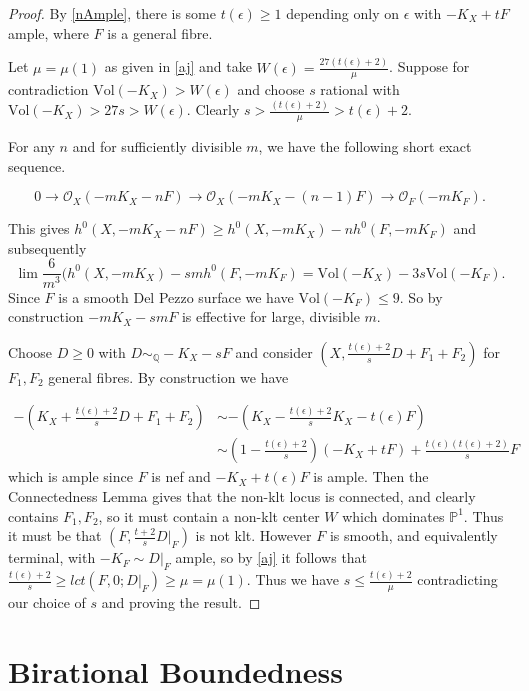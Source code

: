 \documentclass[a4paper,12pt]{book}
\newcommand{\Vol}{\text{Vol}}
\newcommand{\ox}{\mathcal{O}_{X}}
\begin{document}
\begin{proof}
	By \autoref{nAmple}, there is some $t(\epsilon)\geq 1$ depending only on $\epsilon$ with $-K_{X}+tF$ ample, where $F$ is a general fibre.
	
	Let $\mu=\mu(1)$ as given in \autoref{aj} and take $W(\epsilon)= \frac{27(t(\epsilon)+2)}{\mu}$. Suppose for contradiction $\Vol(-K_{X}) > W(\epsilon)$ and choose $s$ rational with $\Vol(-K_{X}) > 27s > W(\epsilon)$. Clearly $s > \frac{(t(\epsilon)+2)}{\mu} > t(\epsilon)+2$. 
	
	For any $n$ and for sufficiently divisible $m$, we have the following short exact sequence.
	
	\[0 \to \ox (-mK_{X}-nF) \to \ox(-mK_{X}-(n-1)F) \to \mathcal{O}_{F}(-mK_{F}).\]
	
	This gives $h^{0}(X,-mK_{X}-nF) \geq h^{0}(X,-mK_{X})-nh^{0}(F,-mK_{F})$ and subsequently 
	\[\lim \frac{6}{m^{3}}(h^{0}(X,-mK_{X})-smh^{0}(F,-mK_{F})= \Vol(-K_{X})-3s\Vol(-K_{F}).\] Since $F$ is a smooth Del Pezzo surface we have $\Vol(-K_{F})\leq 9$.  So by construction $-mK_{X}-smF$ is effective for large, divisible $m$. 
	
	Choose $D\geq 0$ with $D \sim_{\mathbb{Q}} -K_{X}-sF$ and consider $(X,\frac{t(\epsilon)+2}{s}D+F_{1}+F_{2})$ for $F_{1},F_{2}$ general fibres. By construction we have
	
	\begin{align*}
	-(K_{X}+\frac{t(\epsilon)+2}{s}D+F_{1}+F_{2})&\sim -(K_{X}-\frac{t(\epsilon)+2}{s}K_{X}-t(\epsilon)F)\\
	&\sim (1-\frac{t(\epsilon)+2}{s})(-K_{X}+tF) + \frac{t(\epsilon)(t(\epsilon)+2)}{s}F
	\end{align*}
	which is ample since $F$ is nef and $-K_{X}+t(\epsilon)F$ is ample.
	Then the Connectedness Lemma gives that the non-klt locus is connected, and clearly contains $F_{1},F_{2}$, so it must contain a non-klt center $W$ which dominates $\mathbb{P}^{1}$. Thus it must be that $(F,\frac{t+2}{s}D|_{F})$ is not klt. However $F$ is smooth, and equivalently terminal, with $-K_{F}\sim D|_{F}$ ample, so by \autoref{aj} it follows that $\frac{t(\epsilon)+2}{s} \geq lct(F,0;D|_{F}) \geq \mu=\mu(1)$. Thus we have $s \leq \frac{t(\epsilon)+2}{\mu}$ contradicting our choice of $s$ and proving the result.
\end{proof}


\section{Birational Boundedness}
\end{document}
